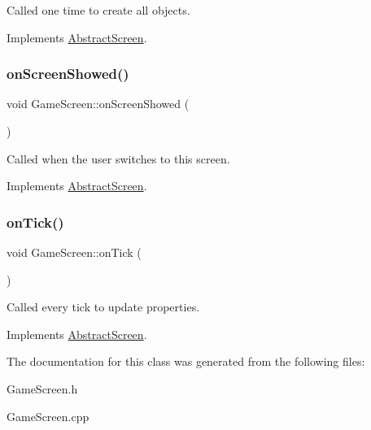 Called one time to create all objects. 



Implements \mbox{\hyperlink{class_abstract_screen_a7ab389bd33f4824d3d353b5a9e1616de}{Abstract\+Screen}}.

\mbox{\label{class_game_screen_a1dfaea8cc8d0edb3bd2711d20e97ebeb}} 
\subsubsection{\texorpdfstring{on\+Screen\+Showed()}{onScreenShowed()}}
{\footnotesize\ttfamily void Game\+Screen\+::on\+Screen\+Showed (\begin{DoxyParamCaption}{ }\end{DoxyParamCaption})\hspace{0.3cm}{\ttfamily [virtual]}}



Called when the user switches to this screen. 



Implements \mbox{\hyperlink{class_abstract_screen_a219687a34e6aed15a9eaf0d4414d1783}{Abstract\+Screen}}.

\mbox{\label{class_game_screen_a0e2549c9c0198f925df16203998bb53b}} 
\subsubsection{\texorpdfstring{on\+Tick()}{onTick()}}
{\footnotesize\ttfamily void Game\+Screen\+::on\+Tick (\begin{DoxyParamCaption}{ }\end{DoxyParamCaption})\hspace{0.3cm}{\ttfamily [virtual]}}



Called every tick to update properties. 



Implements \mbox{\hyperlink{class_abstract_screen_a3861213630fd23d4a3ff392191614ec2}{Abstract\+Screen}}.



The documentation for this class was generated from the following files\+:\begin{DoxyCompactItemize}
\item 
Game\+Screen.\+h\item 
Game\+Screen.\+cpp\end{DoxyCompactItemize}
